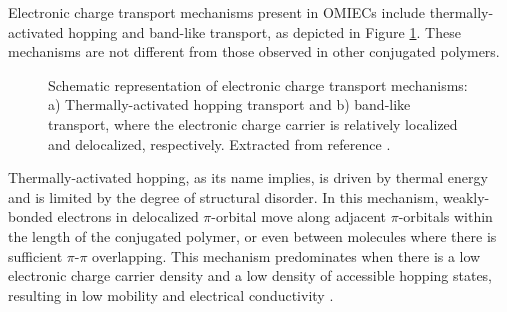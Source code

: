 Electronic charge transport mechanisms present in OMIECs include thermally-activated hopping and band-like transport, as depicted in Figure \ref{fig:etrans}. These mechanisms are not different from those observed in other conjugated polymers. 

\begin{figure}[!htb]
	\centering
	\hspace{2em}
	\caption[Electronic transport mechanisms in OMIECs]{Schematic representation of electronic charge transport mechanisms: a) Thermally-activated hopping transport %
	and b) band-like transport, %
	where the electronic charge carrier is relatively localized and delocalized, respectively. Extracted from reference \cite{paulsenOrganicMixedIonic2020}.} 
	\label{fig:etrans}
\end{figure}

Thermally-activated hopping, as its name implies, is driven by thermal energy and is limited by the degree of structural disorder. In this mechanism, weakly-bonded electrons in delocalized $\pi$-orbital move along adjacent $\pi$-orbitals within the length of the conjugated polymer, or even between molecules where there is sufficient $\pi$-$\pi$ overlapping. This mechanism predominates when there is a low electronic charge carrier density and a low density of accessible hopping states, resulting in low mobility and electrical conductivity \cite{paulsenOrganicMixedIonic2020}. 

